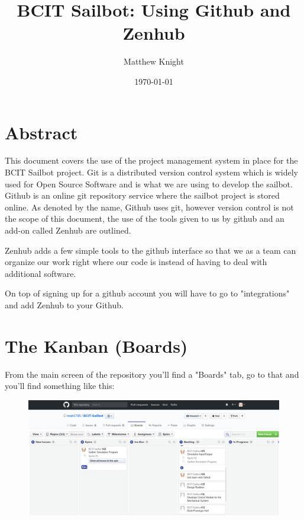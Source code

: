 \documentclass{article}
\title{BCIT Sailbot: Using Github and Zenhub}
\author{Matthew Knight}
\date{\today}
\begin{document}
\maketitle

\newpage

\section*{Abstract}

This document covers the use of the project management system in place for the
BCIT Sailbot project. Git is a distributed version control system which is
widely used for Open Source Software and is what we are using to develop the
sailbot. Github is an online git repository service where the sailbot project is
stored online. As denoted by the name, Github uses git, however version control
is not the scope of this document, the use of the tools given to us by github
and an add-on called Zenhub are outlined.

Zenhub adds a few simple tools to the github interface so that we as a team can
organize our work right where our code is instead of having to deal with
additional software.

On top of signing up for a github account you will have to go to "integrations"
and add Zenhub to your Github.

\section*{The Kanban (Boards)}

From the main screen of the repository you'll find a "Boards" tab, go to that and
you'll find something like this:

\begin{figure}[H]
    \centering
    \includegraphics[scale=0.35]{kanban.png}
\end{figure}
\end{document}

